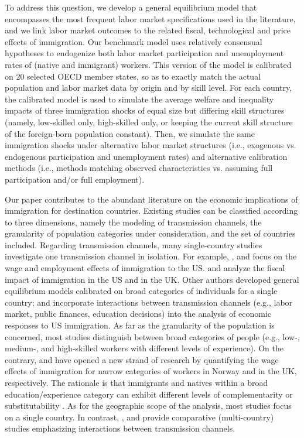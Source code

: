 \documentclass[a4paper,12pt]{article}
\begin{document}
To address this question, we develop a general equilibrium model that encompasses the most frequent labor market specifications used in the literature, and we link labor market outcomes to the related fiscal, technological and price effects of immigration. Our benchmark model uses relatively consensual hypotheses to endogenize both labor market participation and unemployment rates of (native and immigrant) workers. This version of the model is calibrated on 20 selected OECD member states, so as to exactly match the actual population and labor market data by origin and by skill level. For each country, the calibrated model is used to simulate the average welfare and inequality impacts of three immigration shocks of equal size but differing skill structures (namely, low-skilled only, high-skilled only, or keeping the current skill structure of the foreign-born population constant). Then, we simulate the same immigration shocks under alternative labor market structures (i.e., exogenous vs. endogenous participation and unemployment rates) and alternative calibration methods (i.e., methods matching observed characteristics vs. assuming full participation and/or full employment).

Our paper contributes to the abundant literature on the economic implications of immigration for destination countries. Existing studies can be classified according to three dimensions, namely the modeling of transmission channels, the granularity of population categories under consideration, and the set of countries included. Regarding transmission channels, many single-country studies investigate one transmission channel in isolation. For example, \citet{Borjas2003}, \citet{Card1990} and \citet{Chassamboulli2014} focus on the wage and employment effects of immigration to the US. \citet{Auerbach1999} and \citet{Dustmann2014} analyze the fiscal impact of immigration in the US and in the UK. Other authors developed general equilibrium models calibrated on broad categories of individuals for a single country; \citet{Storesletten2000} and \citet{Chojnicki2011} incorporate interactions between transmission channels (e.g., labor market, public finances, education decisions) into the analysis of economic responses to US immigration. As far as the granularity of the population is concerned, most studies distinguish between broad categories of people (e.g., low-, medium-, and high-skilled workers with different levels of experience). On the contrary, \citet{Bratsberg2012} and \citet{Dustmann2013} have opened a new strand of research by quantifying the wage effects of immigration for narrow categories of workers in Norway and in the UK, respectively. The rationale is that immigrants and natives within a broad education/experience category can exhibit different levels of complementarity or substitutability \citep[see also][]{Basso2017,Peri2009}. As for the geographic scope of the analysis, most studies focus on a single country. In contrast, \citet{Aubry2016}, \citet{Battisti2018} and \citet{Burzynski2018} provide comparative (multi-country) studies emphasizing interactions between transmission channels. 
\end{document}
